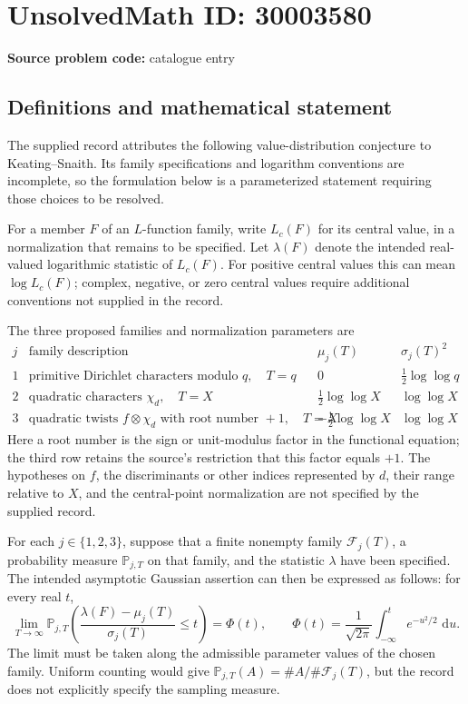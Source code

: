 \documentclass[11pt]{article}
\newcommand{\dd}{\,\mathrm{d}}
\begin{document}
\section*{UnsolvedMath ID: 30003580}
\textbf{Source problem code:} catalogue entry
\subsection{Definitions and mathematical statement}
The supplied record attributes the following value-distribution conjecture to Keating--Snaith. Its family specifications and logarithm conventions are incomplete, so the formulation below is a parameterized statement requiring those choices to be resolved.

For a member \(F\) of an \(L\)-function family, write \(L_c(F)\) for its central value, in a normalization that remains to be specified. Let \(\lambda(F)\) denote the intended real-valued logarithmic statistic of \(L_c(F)\). For positive central values this can mean \(\log L_c(F)\); complex, negative, or zero central values require additional conventions not supplied in the record.

The three proposed families and normalization parameters are
\[
\begin{array}{c|c|c|c}
j & \text{family description} & \mu_j(T) & \sigma_j(T)^2\\ \hline
1 & \text{primitive Dirichlet characters modulo }q,\quad T=q
  & 0 & \tfrac12\log\log q\\
2 & \text{quadratic characters }\chi_d,\quad T=X
  & \tfrac12\log\log X & \log\log X\\
3 & \text{quadratic twists }f\otimes\chi_d\text{ with root number }+1,\quad T=X
  & -\tfrac12\log\log X & \log\log X
\end{array}
\]
Here a root number is the sign or unit-modulus factor in the functional equation; the third row retains the source's restriction that this factor equals \(+1\). The hypotheses on \(f\), the discriminants or other indices represented by \(d\), their range relative to \(X\), and the central-point normalization are not specified by the supplied record.

For each \(j\in\{1,2,3\}\), suppose that a finite nonempty family \(\mathcal F_j(T)\), a probability measure \(\mathbb P_{j,T}\) on that family, and the statistic \(\lambda\) have been specified. The intended asymptotic Gaussian assertion can then be expressed as follows: for every real \(t\),
\[
\lim_{T\to\infty}
\mathbb P_{j,T}\!\left(
\frac{\lambda(F)-\mu_j(T)}{\sigma_j(T)}\le t
\right)
=\Phi(t),
\qquad
\Phi(t)=\frac{1}{\sqrt{2\pi}}
\int_{-\infty}^{t}e^{-u^2/2}\,\dd u.
\]
The limit must be taken along the admissible parameter values of the chosen family. Uniform counting would give
\(\mathbb P_{j,T}(A)=\#A/\#\mathcal F_j(T)\), but the record does not explicitly specify the sampling measure.
\end{document}
